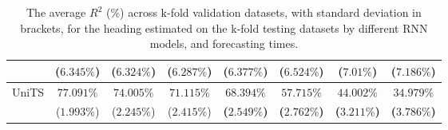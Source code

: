 \begin{table}[!ht]
{\begin{tabular}{|c|c|c|c|c|c|c|c|}
			 & ($6.345\%$) & ($6.324\%$) & ($6.287\%$) & ($6.377\%$) & ($6.524\%$) & ($7.01\%$) & ($7.186\%$) \\ \hline
			\multirow{2}{*}{UniTS} & $77.091\%$ & $74.005\%$ & $71.115\%$ & $\mathbf{68.394\%}$ & $\mathbf{57.715\%}$ & $\mathbf{44.002\%}$ & $\mathbf{34.979\%}$ \\
			 & ($1.993\%$) & ($2.245\%$) & ($2.415\%$) & \textbf{(}$\mathbf{2.549\%}$\textbf{)} & \textbf{(}$\mathbf{2.762\%}$\textbf{)} & \textbf{(}$\mathbf{3.211\%}$\textbf{)} & \textbf{(}$\mathbf{3.786\%}$\textbf{)} \\ \hline
		\end{tabular}
	}
	\caption{The average $R^{2}$ (\%) across k-fold validation datasets, with standard deviation in brackets, for the heading estimated on the k-fold testing datasets by different RNN models, and forecasting times.}
	\label{tab:all_direction_R2}
\end{table}